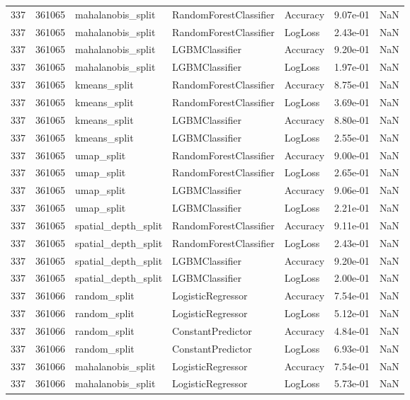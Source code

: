 \begin{tabular}{rrlllrr}
337 & 361065 & mahalanobis\_split & RandomForestClassifier & Accuracy & 9.07e-01 & NaN \\
337 & 361065 & mahalanobis\_split & RandomForestClassifier & LogLoss & 2.43e-01 & NaN \\
337 & 361065 & mahalanobis\_split & LGBMClassifier & Accuracy & 9.20e-01 & NaN \\
337 & 361065 & mahalanobis\_split & LGBMClassifier & LogLoss & 1.97e-01 & NaN \\
337 & 361065 & kmeans\_split & RandomForestClassifier & Accuracy & 8.75e-01 & NaN \\
337 & 361065 & kmeans\_split & RandomForestClassifier & LogLoss & 3.69e-01 & NaN \\
337 & 361065 & kmeans\_split & LGBMClassifier & Accuracy & 8.80e-01 & NaN \\
337 & 361065 & kmeans\_split & LGBMClassifier & LogLoss & 2.55e-01 & NaN \\
337 & 361065 & umap\_split & RandomForestClassifier & Accuracy & 9.00e-01 & NaN \\
337 & 361065 & umap\_split & RandomForestClassifier & LogLoss & 2.65e-01 & NaN \\
337 & 361065 & umap\_split & LGBMClassifier & Accuracy & 9.06e-01 & NaN \\
337 & 361065 & umap\_split & LGBMClassifier & LogLoss & 2.21e-01 & NaN \\
337 & 361065 & spatial\_depth\_split & RandomForestClassifier & Accuracy & 9.11e-01 & NaN \\
337 & 361065 & spatial\_depth\_split & RandomForestClassifier & LogLoss & 2.43e-01 & NaN \\
337 & 361065 & spatial\_depth\_split & LGBMClassifier & Accuracy & 9.20e-01 & NaN \\
337 & 361065 & spatial\_depth\_split & LGBMClassifier & LogLoss & 2.00e-01 & NaN \\
337 & 361066 & random\_split & LogisticRegressor & Accuracy & 7.54e-01 & NaN \\
337 & 361066 & random\_split & LogisticRegressor & LogLoss & 5.12e-01 & NaN \\
337 & 361066 & random\_split & ConstantPredictor & Accuracy & 4.84e-01 & NaN \\
337 & 361066 & random\_split & ConstantPredictor & LogLoss & 6.93e-01 & NaN \\
337 & 361066 & mahalanobis\_split & LogisticRegressor & Accuracy & 7.54e-01 & NaN \\
337 & 361066 & mahalanobis\_split & LogisticRegressor & LogLoss & 5.73e-01 & NaN \\

\end{tabular}
